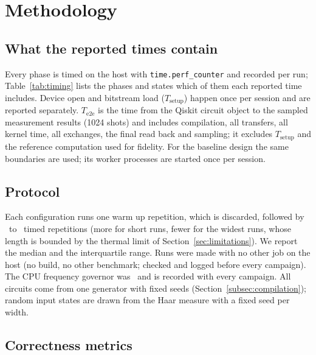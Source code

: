 \section{Methodology}\label{sec:methodology}

\subsection{What the reported times contain}\label{subsec:timing}

Every phase is timed on the host with \texttt{time.perf\_counter} and recorded per run; Table~\ref{tab:timing} lists
the phases and states which of them each reported time includes. Device open and bitstream load ($T_{\mathrm{setup}}$)
happen once per session and are reported separately. $T_{\mathrm{e2e}}$ is the time from the Qiskit circuit object to
the sampled measurement results (1024 shots) and includes compilation, all transfers, all kernel time, all exchanges,
the final read back and sampling; it excludes $T_{\mathrm{setup}}$ and the reference computation used for fidelity.
For the baseline design the same boundaries are used; its worker processes are started once per session.

\begin{table}[t]
\caption{Timing phases and their inclusion in the reported times.}\label{tab:timing}

\end{table}

\subsection{Protocol}\label{subsec:protocol}

Each configuration runs one warm up repetition, which is discarded, followed by \NumRepsMin\ to \NumRepsMax~timed
repetitions (more for short runs, fewer for the widest runs, whose length is bounded by the thermal limit of
Section~\ref{sec:limitations}). We report the median and the interquartile range.
Runs were made with no other job on the host (no build, no other benchmark; checked and logged before every campaign).
The CPU frequency governor was \NumGovernor\ and is recorded with every campaign. All circuits come from one
generator with fixed seeds (Section~\ref{subsec:compilation}); random input states are drawn from the Haar measure with
a fixed seed per width.

\subsection{Correctness metrics}\label{subsec:metrics}

